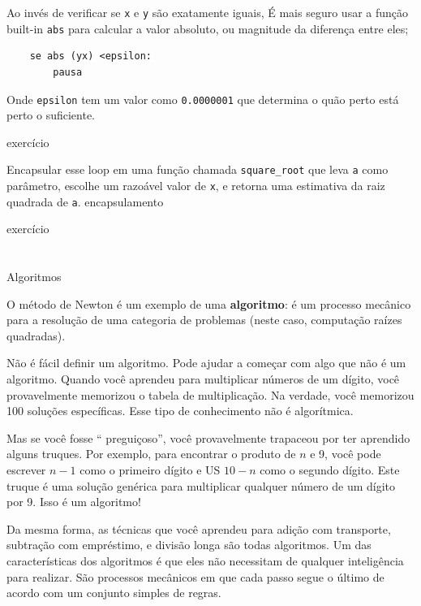 \documentclass[10pt]{book}
\begin{document}
{Ao invés de verificar se {\tt x} e {\tt y} são exatamente iguais,
É mais seguro usar a função built-in {\tt abs} para calcular a
valor absoluto, ou magnitude da diferença entre eles;

\begin{verbatim}
    se abs (yx) <epsilon:
        pausa
\end{verbatim}
%
Onde \verb "epsilon" tem um valor como {\tt 0.0000001} que
determina o quão perto está perto o suficiente.

\begin{} exercício

Encapsular esse loop em uma função chamada \verb "square_root"
que leva {\tt a} como parâmetro, escolhe um razoável
valor de {\tt x}, e retorna uma estimativa da raiz quadrada
de {\tt a}.
\index{} encapsulamento

\end{} exercício


\section{} Algoritmos

O método de Newton é um exemplo de uma {\bf algoritmo}: é um
processo mecânico para a resolução de uma categoria de problemas (neste
caso, computação raízes quadradas).

Não é fácil definir um algoritmo. Pode ajudar a começar
com algo que não é um algoritmo. Quando você aprendeu
para multiplicar números de um dígito, você provavelmente memorizou o
tabela de multiplicação. Na verdade, você memorizou 100 soluções específicas.
Esse tipo de conhecimento não é algorítmica.

Mas se você fosse `` preguiçoso'', você provavelmente trapaceou por ter aprendido alguns
truques. Por exemplo, para encontrar o produto de $ n $ e 9, você pode
escrever $ n-1 $ como o primeiro dígito e US $ 10-n $ como o segundo
dígito. Este truque é uma solução genérica para multiplicar qualquer
número de um dígito por 9. Isso é um algoritmo!

Da mesma forma, as técnicas que você aprendeu para adição com transporte,
subtração com empréstimo, e divisão longa são todas algoritmos. Um
das características dos algoritmos é que eles não necessitam de qualquer
inteligência para realizar. São processos mecânicos em que
cada passo segue o último de acordo com um conjunto simples de regras.

}
\end{document}
